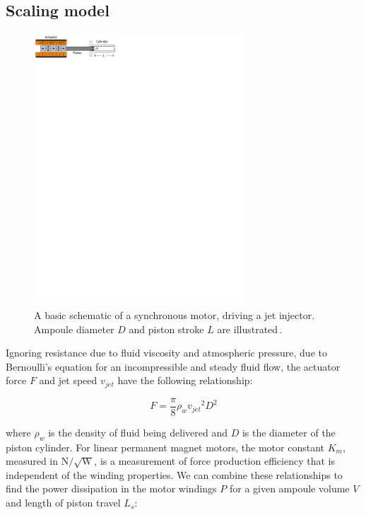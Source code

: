     \subsection{Scaling model}                  \label{Chapter:PMLSM design HM/electromagnetic model/scaling}


        \begin{figure}[ht]
          \centering
          \includegraphics[width=0.7\textwidth]{chap3/images/PMLSM_scaling_law_illustration.pdf}
          \caption[LoF entry]{A basic schematic of a synchronous motor, driving a jet injector. Ampoule diameter $D$ and piston stroke $L$ are illustrated\,\cite{Ruddy2015}.}
          \label{fig:chapter/hm/PMLSM scaling law illustrated}
        \end{figure}


        Ignoring resistance due to fluid viscosity and atmospheric pressure, due to Bernoulli's equation for an incompressible and steady fluid flow, the actuator force $F$ and jet speed $v_{jet}$ have the following relationship:
        
        
        \begin{equation}
            F=\frac{\pi}{8}\rho_w {v_{jet}}^2 D^2
            \label{eq:actuation force by PMLSMs}
        \end{equation}
        
        
        where $\rho_w$ is the density of fluid being delivered and $D$ is the diameter of the piston cylinder. For linear permanent magnet motors, the motor constant $K_m$, measured in $\mathrm{N/\sqrt{W}}$, is a measurement of force production efficiency that is independent of the winding properties. We can combine these relationships to find the power dissipation in the motor windings $P$ for a given ampoule volume $V$ and length of piston travel $L_s$:


